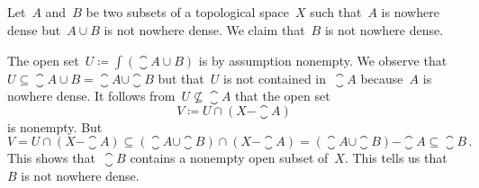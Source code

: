\subsection{}

Let~$A$ and~$B$ be two subsets of a topological space~$X$ such that~$A$ is nowhere dense but~$A ∪ B$ is not nowhere dense.
We claim that~$B$ is not nowhere dense.

The open set~$U ≔ \int(\closure{A ∪ B})$ is by assumption nonempty.
We observe that~$U ⊆ \closure{A ∪ B} = \closure{A} ∪ \closure{B}$ but that~$U$ is not contained in~$\closure{A}$ because~$A$ is nowhere dense.
It follows from~$U ⊈ \closure{A}$ that the open set
\[
	V ≔ U ∩ (X - \closure{A})
\]
is nonempty.
But
\[
	V
	=
	U ∩ (X - \closure{A})
	⊆
	(\closure{A} ∪ \closure{B}) ∩ (X - \closure{A})
	=
	(\closure{A} ∪ \closure{B}) - \closure{A}
	⊆
	\closure{B} \,.
\]
This shows that~$\closure{B}$ contains a nonempty open subset of~$X$.
This tells us that~$B$ is not nowhere dense.

